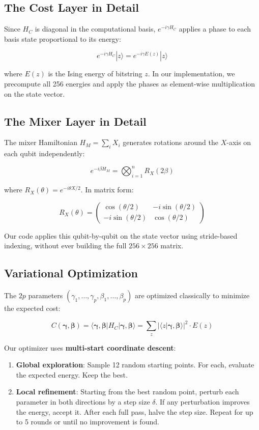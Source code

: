 \documentclass[12pt, a4paper]{article}
\begin{document}
\subsection{The Cost Layer in Detail}

Since $H_C$ is diagonal in the computational basis, $e^{-i \gamma H_C}$
applies a phase to each basis state proportional to its energy:

\[
e^{-i \gamma H_C} |z\rangle = e^{-i \gamma E(z)} |z\rangle
\]

where $E(z)$ is the Ising energy of bitstring $z$. In our implementation, we
precompute all 256 energies and apply the phases as element-wise multiplication
on the state vector.

\subsection{The Mixer Layer in Detail}

The mixer Hamiltonian $H_M = \sum_i X_i$ generates rotations around the
$X$-axis on each qubit independently:

\[
e^{-i \beta H_M} = \bigotimes_{i=1}^{n} R_X(2\beta)
\]

where $R_X(\theta) = e^{-i \theta X / 2}$. In matrix form:

\[
R_X(\theta) = \begin{pmatrix}
\cos(\theta/2) & -i\sin(\theta/2) \\
-i\sin(\theta/2) & \cos(\theta/2)
\end{pmatrix}
\]

Our code applies this qubit-by-qubit on the state vector using stride-based
indexing, without ever building the full $256 \times 256$ matrix.

\subsection{Variational Optimization}

The $2p$ parameters $(\gamma_1, \ldots, \gamma_p, \beta_1, \ldots, \beta_p)$
are optimized classically to minimize the expected cost:

\[
C(\bm{\gamma}, \bm{\beta})
= \langle \bm{\gamma}, \bm{\beta} | H_C | \bm{\gamma}, \bm{\beta} \rangle
= \sum_{z} |\langle z | \bm{\gamma}, \bm{\beta} \rangle|^2 \cdot E(z)
\]

Our optimizer uses \textbf{multi-start coordinate descent}:

\begin{enumerate}
    \item \textbf{Global exploration}: Sample 12 random starting points.
    For each, evaluate the expected energy. Keep the best.
    \item \textbf{Local refinement}: Starting from the best random point,
    perturb each parameter in both directions by a step size $\delta$. If any
    perturbation improves the energy, accept it. After each full pass, halve
    the step size. Repeat for up to 5 rounds or until no improvement is found.
\end{enumerate}
\end{document}
